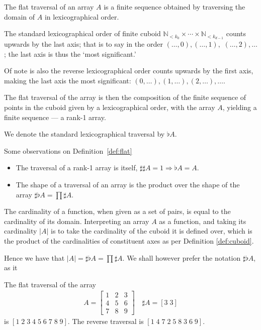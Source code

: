 \documentclass{DIKU-report-variant}
\newcommand\Nat{\mathbb{N}}
\newcommand\impl{\mathrel{\Rightarrow}}
\begin{document}
\begin{definition}
  \label{def:flat}
  The flat traversal of an array \(A\) is a finite sequence obtained by
  traversing the domain of \(A\) in lexicographical order.
  
  The standard lexicographical order of finite cuboid
  \(\Nat_{<k_0} \times \cdots \times \Nat_{<k_{d-1}}\) counts upwards by the
  last axis; that is to say in the order \((\dots,0), (\dots,1),\) \((\dots,2), \dots\);
  the last axis is thus the `most significant.'

  Of note is also the reverse lexicographical order counts upwards by the first
  axis, making the last axis the most significant: \((0,\dots), (1,\dots), (2,\dots), \dots\).

  The flat traversal of the array is then the composition of the finite
  sequence of points in the cuboid given by a lexicographical order,
  with the array \(A\), yielding a finite sequence --- a rank-1 array.

  We denote the standard lexicographical traversal by \(\flat A\).
\end{definition}
\begin{observation}
  \label{ob:flat}
  Some observations on Definition~\ref{def:flat}
  \begin{itemize}
    \item The traversal of a rank-1 array is itself, \(\sharp \sharp A = 1 \impl \flat A = A\).

    \item The shape of a traversal of an array is the product over the shape
      of the array \(\sharp \flat A = \prod \sharp A\).
  \end{itemize}
\end{observation}

\begin{observation}
  \label{ob:cardinality}
  The cardinality of a function, when given as a set of pairs, is equal to
  the cardinality of its domain. Interpreting an array \(A\) as a function, and
  taking its cardinality \(|A|\) is to take the cardinality of the cuboid it is
  defined over, which is the product of the cardinalities of constituent axes as
  per Definition \ref{def:cuboid}.

  Hence we have that \(|A| = \sharp \flat A = \prod \sharp A\).
  We shall however prefer the notation \(\sharp \flat A\), as it
\end{observation}

\begin{example}
  \label{ex:flat}
  The flat traversal of the array
  \begin{align*}
    A =
    \begin{bmatrix}
      1 & 2 & 3 \\
      4 & 5 & 6 \\
      7 & 8 & 9
    \end{bmatrix} \quad \sharp A = [3\; 3]
  \end{align*}
  is \([1\; 2\; 3\; 4\; 5\; 6\; 7\; 8\; 9]\).
  The reverse traversal is \([1\; 4\; 7\; 2\; 5\; 8\; 3\; 6\; 9]\).
\end{example}
\end{document}
